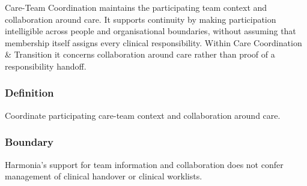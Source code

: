 Care-Team Coordination maintains the participating team context and collaboration around care. It supports continuity by making participation intelligible across people and organisational boundaries, without assuming that membership itself assigns every clinical responsibility. Within Care Coordination \& Transition it concerns collaboration around care rather than proof of a responsibility handoff.

\subsubsection*{Definition}

Coordinate participating care-team context and collaboration around care.

\subsubsection*{Boundary}

Harmonia's support for team information and collaboration does not confer management of clinical handover or clinical worklists.

